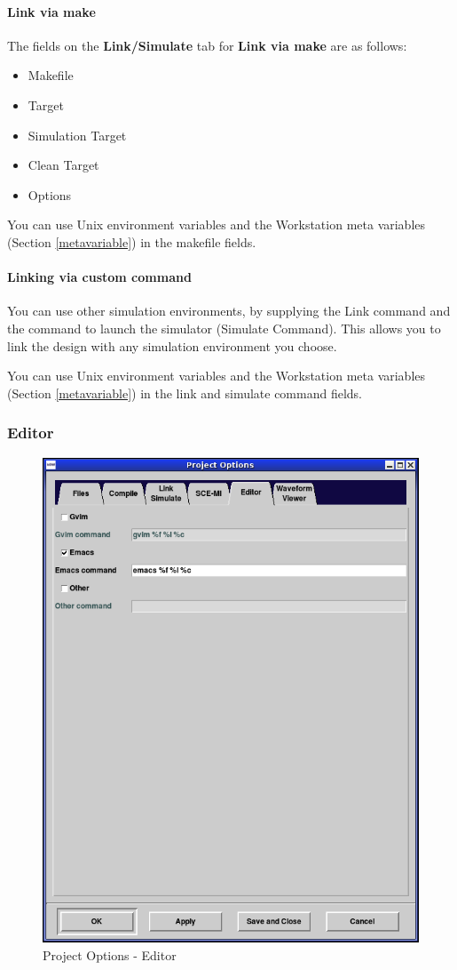 \documentclass{article}
\begin{document}
\paragraph{Link via make}
The fields on the {\bf Link/Simulate} tab for  {\bf Link via make}
are as follows:
\begin{itemize}
\item Makefile
\item Target
\item Simulation Target
\item Clean Target
\item Options
\end{itemize}



You can  use Unix environment variables and the Workstation meta
variables (Section \ref{metavariable}) in the makefile fields.

\paragraph{Linking via custom command}

You can use other simulation environments, by supplying the Link
command and the  command to launch  the
simulator (Simulate Command).
  This allows you to link the design with any simulation environment you choose.


You can  use Unix environment variables and the Workstation meta
variables (Section \ref{metavariable}) in the link and simulate
command fields.


\subsubsection{Editor}

\begin{figure}[ht]
\begin{center}
\includegraphics[width = 3 in]{figures/options-editor}
\caption{Project Options - Editor}
\label{fig-editor}
\end{center}
\end{figure}
\end{document}
